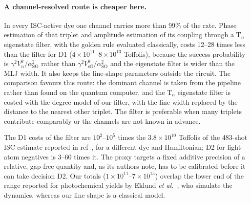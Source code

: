 \documentclass[journal=jctcce,manuscript=article]{achemso}
\newcommand{\aso}{\alpha_\mathrm{SO}}
\begin{document}
\paragraph{A channel-resolved route is cheaper here.} In every ISC-active dye one channel carries more than
99\% of the rate. Phase estimation of that triplet and amplitude estimation of its coupling through a T$_n$
eigenstate filter, with the golden rule evaluated classically, costs 12--28 times less than the filter for
D1 ($4\times10^{11}$--$8\times10^{13}$ Toffolis), because the success probability is $\gamma^2V_n^2/\aso^2$
rather than $\gamma^2V_\mathrm{eff}^2/\aso^2$ and the eigenstate filter is wider than the MLJ width. It also
keeps the line-shape parameters outside the circuit. The comparison favours this route: the dominant channel is taken
from the pipeline rather than found on the quantum computer, and the T$_n$ eigenstate filter is costed with the degree model of our filter, with the line width replaced by the
distance to the nearest other triplet. The filter is preferable when many triplets contribute
comparably or the channels are not known in advance.

The D1 costs of the filter are $10^{2}$--$10^{5}$ times the $3.8\times10^{10}$ Toffolis of the 483-shot ISC
estimate reported in ref~, for a different dye and Hamiltonian; D2 for light-atom
negatives is 3--60 times it. The proxy targets a fixed additive precision of a relative, gap-free quantity
and, as its authors note, has to be calibrated before it can take decision D2. Our totals
($1\times10^{11}$--$7\times10^{15}$) overlap the lower end of the range reported for photochemical yields by
Eklund \emph{et al.}~\cite{Eklund2026}, who simulate the dynamics, whereas our line shape is a classical model.
\end{document}
